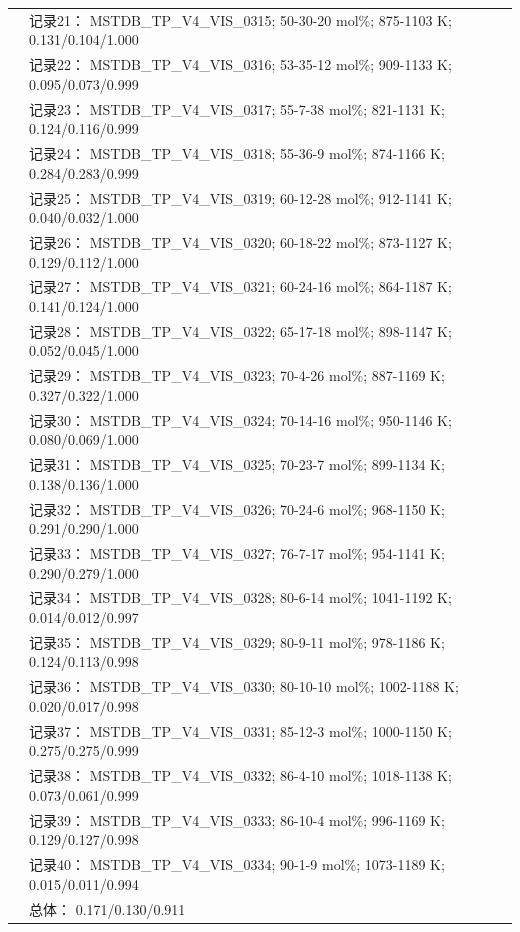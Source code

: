 \documentclass[12pt]{article}
\begin{document}
{\begin{longtable}[]{@{}
  >{\raggedright\arraybackslash}p{}
  >{\raggedright\arraybackslash}p{}@{}}
 & 记录21： MSTDB\_TP\_V4\_VIS\_0315; 50-30-20 mol\%; 875-1103 K; 0.131/0.104/1.000 \\
 & 记录22： MSTDB\_TP\_V4\_VIS\_0316; 53-35-12 mol\%; 909-1133 K; 0.095/0.073/0.999 \\
 & 记录23： MSTDB\_TP\_V4\_VIS\_0317; 55-7-38 mol\%; 821-1131 K; 0.124/0.116/0.999 \\
 & 记录24： MSTDB\_TP\_V4\_VIS\_0318; 55-36-9 mol\%; 874-1166 K; 0.284/0.283/0.999 \\
 & 记录25： MSTDB\_TP\_V4\_VIS\_0319; 60-12-28 mol\%; 912-1141 K; 0.040/0.032/1.000 \\
 & 记录26： MSTDB\_TP\_V4\_VIS\_0320; 60-18-22 mol\%; 873-1127 K; 0.129/0.112/1.000 \\
 & 记录27： MSTDB\_TP\_V4\_VIS\_0321; 60-24-16 mol\%; 864-1187 K; 0.141/0.124/1.000 \\
 & 记录28： MSTDB\_TP\_V4\_VIS\_0322; 65-17-18 mol\%; 898-1147 K; 0.052/0.045/1.000 \\
 & 记录29： MSTDB\_TP\_V4\_VIS\_0323; 70-4-26 mol\%; 887-1169 K; 0.327/0.322/1.000 \\
 & 记录30： MSTDB\_TP\_V4\_VIS\_0324; 70-14-16 mol\%; 950-1146 K; 0.080/0.069/1.000 \\
 & 记录31： MSTDB\_TP\_V4\_VIS\_0325; 70-23-7 mol\%; 899-1134 K; 0.138/0.136/1.000 \\
 & 记录32： MSTDB\_TP\_V4\_VIS\_0326; 70-24-6 mol\%; 968-1150 K; 0.291/0.290/1.000 \\
 & 记录33： MSTDB\_TP\_V4\_VIS\_0327; 76-7-17 mol\%; 954-1141 K; 0.290/0.279/1.000 \\
 & 记录34： MSTDB\_TP\_V4\_VIS\_0328; 80-6-14 mol\%; 1041-1192 K; 0.014/0.012/0.997 \\
 & 记录35： MSTDB\_TP\_V4\_VIS\_0329; 80-9-11 mol\%; 978-1186 K; 0.124/0.113/0.998 \\
 & 记录36： MSTDB\_TP\_V4\_VIS\_0330; 80-10-10 mol\%; 1002-1188 K; 0.020/0.017/0.998 \\
 & 记录37： MSTDB\_TP\_V4\_VIS\_0331; 85-12-3 mol\%; 1000-1150 K; 0.275/0.275/0.999 \\
 & 记录38： MSTDB\_TP\_V4\_VIS\_0332; 86-4-10 mol\%; 1018-1138 K; 0.073/0.061/0.999 \\
 & 记录39： MSTDB\_TP\_V4\_VIS\_0333; 86-10-4 mol\%; 996-1169 K; 0.129/0.127/0.998 \\
 & 记录40： MSTDB\_TP\_V4\_VIS\_0334; 90-1-9 mol\%; 1073-1189 K; 0.015/0.011/0.994 \\
 & 总体： 0.171/0.130/0.911  \\


\end{longtable}}
\end{document}
